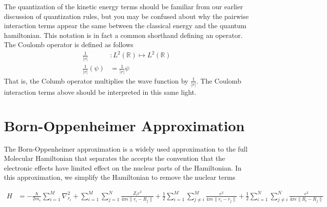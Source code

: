 \documentclass[book.tex]{subfiles}
\begin{document}
The quantization of the kinetic energy terms should be familiar from our earlier discussion of quantization rules, but you may be confused about why the pairwise interaction terms appear the same between the classical energy and the quantum hamiltonian. This notation is in fact a common shorthand defining an operator. The Coulomb operator is defined as follows
\begin{align}
\frac{1}{|r|} &: L^2(\mathbb{R}) \mapsto L^2(\mathbb{R}) \\
\frac{1}{|r|}(\psi) &= \frac{1}{|r|}\psi
\end{align}
That is, the Columb operator multiplies the wave function by $\frac{1}{|r|}$. The Coulomb interaction terms above should be interpreted in this same light.

\section{Born-Oppenheimer Approximation}

The Born-Oppenheimer approximation is a widely used approximation to the full Molecular Hamiltonian that separates the accepts the convention that the electronic effects have limited effect on the nuclear parts of the Hamiltonian. In this approximation, we simplify the Hamiltonian to remove the nuclear terms

\begin{align}
    H &= - \frac{\hbar}{2m_e}\sum_{i=1}^M \nabla^2_{r_i} 
    + \sum_{i=1}^M\sum_{j=1}^N \frac{Z_i e^2}{4 \pi \epsilon \|r_i-R_j\|} + \frac{1}{2} \sum_{i=1}^M \sum_{j\neq i}^M \frac{e^2}{4 \pi \epsilon \|r_i - r_j\|} + \frac{1}{2} \sum_{i=1}^N \sum_{j\neq i}^N \frac{e^2}{4 \pi \epsilon \|R_i - R_j\|} 
\end{align}
\end{document}
